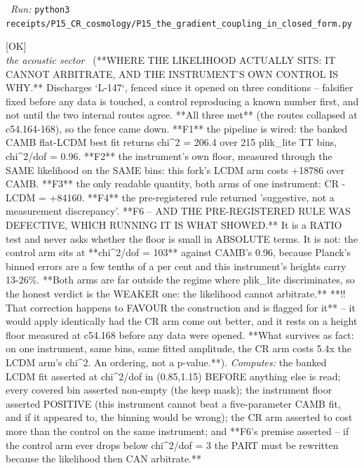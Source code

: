 \begin{description}
\ \emph{Run:} \texttt{python3 receipts/P15\_CR\_cosmology/P15\_the\_gradient\_coupling\_in\_closed\_form.py}
\item[\rcptlabel{P15_where_the_likelihood_sits}{P15R67}\textbf{P15R67}\quad\texttt{P15\_where\_the\_likelihood\_sits}]\hfill\textsf{[OK]}\\
\textit{the acoustic sector} \ (**WHERE THE LIKELIHOOD ACTUALLY SITS: IT CANNOT ARBITRATE, AND THE INSTRUMENT'S OWN CONTROL IS WHY.** Discharges `L-147`, fenced since it opened on three conditions -- falsifier fixed before any data is touched, a control reproducing a known number first, and not until the two internal routes agree. **All three met** (the routes collapsed at c54.164-168), so the fence came down. **F1** the pipeline is wired: the banked CAMB flat-LCDM best fit returns chi\textasciicircum{}2 = 206.4 over 215 plik\_lite TT bins, chi\textasciicircum{}2/dof = 0.96. **F2** the instrument's own floor, measured through the SAME likelihood on the SAME bins: this fork's LCDM arm costs +18786 over CAMB. **F3** the only readable quantity, both arms of one instrument: CR - LCDM = +84160. **F4** the pre-registered rule returned 'suggestive, not a measurement discrepancy'. **F6 -- AND THE PRE-REGISTERED RULE WAS DEFECTIVE, WHICH RUNNING IT IS WHAT SHOWED.** It is a RATIO test and never asks whether the floor is small in ABSOLUTE terms. It is not: the control arm sits at **chi\textasciicircum{}2/dof = 103** against CAMB's 0.96, because Planck's binned errors are a few tenths of a per cent and this instrument's heights carry 13-26\%. **Both arms are far outside the regime where plik\_lite discriminates, so the honest verdict is the WEAKER one: the likelihood cannot arbitrate.** **!! That correction happens to FAVOUR the construction and is flagged for it** -- it would apply identically had the CR arm come out better, and it rests on a height floor measured at c54.168 before any data were opened. **What survives as fact: on one instrument, same bins, same fitted amplitude, the CR arm costs 5.4x the LCDM arm's chi\textasciicircum{}2. An ordering, not a p-value.**). 
\emph{Computes:} the banked LCDM fit asserted at chi\textasciicircum{}2/dof in (0.85,1.15) BEFORE anything else is read; every covered bin asserted non-empty (the keep mask); the instrument floor asserted POSITIVE (this instrument cannot beat a five-parameter CAMB fit, and if it appeared to, the binning would be wrong); the CR arm asserted to cost more than the control on the same instrument; and **F6's premise asserted -- if the control arm ever drops below chi\textasciicircum{}2/dof = 3 the PART must be rewritten because the likelihood then CAN arbitrate.**

\end{description}
